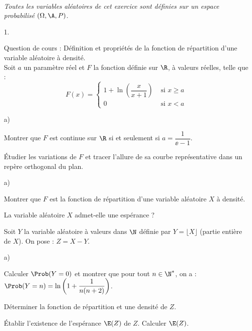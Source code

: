 \begin{exerciceAP}~\\
  {\it Toutes les variables aléatoires de cet exercice sont définies
    sur un espace probabilisé $(\Omega,\A,P)$}.
  \begin{noliste}{1.}
    \setlength{\itemsep}{2mm}
  \item Question de cours : Définition et propriétés de la fonction de
    répartition d'une variable aléatoire à densité.\\
    Soit $a$ un paramètre réel et $F$ la fonction définie sur $\R$, à
    valeurs réelles, telle que :
    \[
    F(x)=\left\{
      \begin{array}{cl}
        1+\ln\left(\dfrac{x}{x+1}\right) & \mbox{ si $x\geq a$}\\
        0 & \mbox{ si $x<a$}
      \end{array}
    \right.
    \]
  \item 
    \begin{noliste}{a)}
    \setlength{\itemsep}{2mm}
    \item Montrer que $F$ est continue sur $\R$ si et seulement si
      $a=\dfrac{1}{\ee -1}$.

    \item Étudier les variations de $F$ et tracer l'allure de sa
      courbe représentative dans un repère orthogonal du plan.
    \end{noliste}

  \item
    \begin{noliste}{a)}
    \setlength{\itemsep}{2mm}
    \item Montrer que $F$ est la fonction de répartition d'une
      variable aléatoire $X$ à densité.
    \item La variable aléatoire $X$ admet-elle une espérance ?
    \end{noliste}

  \item Soit $Y$ la variable aléatoire à valeurs dans $\N$ définie par
    $Y=\lfloor X\rfloor$ (partie entière de $X$). On pose : $Z=X-Y$.
    \begin{noliste}{a)}
    \setlength{\itemsep}{2mm}
  \item Calculer $\Prob(Y=0)$ et montrer que pour tout $n\in\N^*$, on
    a : $\Prob(Y=n) = \ln\left(1 + \dfrac{1}{n(n + 2)}\right)$.
    \item Déterminer la fonction de répartition et une densité de $Z$.
    \item Établir l'existence de l'espérance $\E(Z)$ de $Z$. Calculer
      $\E(Z)$.
    \end{noliste}
  \end{noliste}
\end{exerciceAP} 


